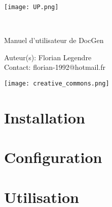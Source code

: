 \documentclass[a4paper, french]{article}
\begin{document}
\begin{titlepage}
    \begin{flushleft}
        \texttt{[image: UP.png]}\par
        \centering
        
        \vspace{13\baselineskip}       
        \HRule \\[0.4cm]

        {\Huge 
        Manuel d'utilisateur de DocGen\par}
        \vspace{0.4cm}
        \HRule
        \vfill
      
        Auteur(s): Florian Legendre\\
        Contact: florian-1992@hotmail.fr\medskip \par
        
        \texttt{[image: creative\_commons.png]}\par
    \end{flushleft}
\end{titlepage}


\newpage
\pagestyle{empty}
\tableofcontents
{}
\pagestyle{plain}

\newpage




\part{Installation}

\newpage

\part{Configuration}

\newpage

\part{Utilisation}

\end{document}
